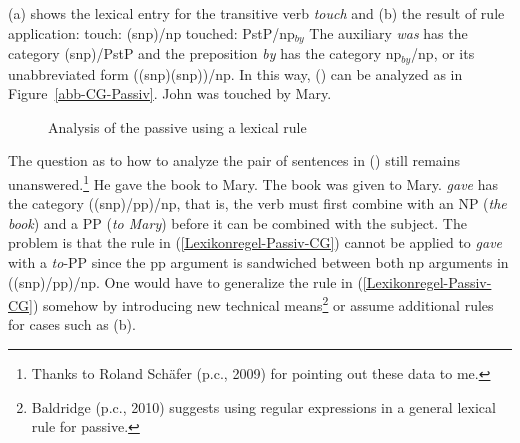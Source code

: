 (a) shows the lexical entry for the transitive verb \emph{touch} and (b) the result of rule application:
\eal
\ex touch:   (s\bs np)/np
\ex touched: PstP/np$_{by}$ 
\zl
\largerpage[2]
The auxiliary \emph{was} has the category (s\bs np)/PstP and the preposition \emph{by} has the category  np$_{by}$/np, or its unabbreviated form ((s\bs np)\bs (s\bs np))/np.
In this way, () can be analyzed as in Figure~\vref{abb-CG-Passiv}.
\ea
John was touched by Mary.
\z
\begin{figure}
\centerline{%
}
\caption{\label{abb-CG-Passiv}Analysis of the passive using a lexical rule}
\end{figure}%

\noindent
The question as to how to analyze the pair of sentences in () still remains unanswered.\footnote{%
	Thanks to Roland Schäfer (p.c., 2009) for pointing out these data to me.
}
\eal
\ex He gave the book to Mary.
\ex The book was given to Mary.
\zl
\emph{gave} has the category ((s\bs np)/pp)/np, that is, the verb must first combine with an NP
(\emph{the book}) and a PP (\emph{to Mary}) before it can be combined with the subject. The problem
is that the rule in (\ref{Lexikonregel-Passiv-CG}) cannot be applied to \emph{gave} with a
\emph{to}-PP since the pp argument is sandwiched between both np arguments in ((s\bs np)/pp)/np. One
would have to generalize the rule in (\ref{Lexikonregel-Passiv-CG}) somehow by introducing new
technical means\footnote{%
  Baldridge (p.c., 2010) suggests using regular expressions in a general lexical rule for passive.%
 }
or assume additional rules for cases such as (b).

